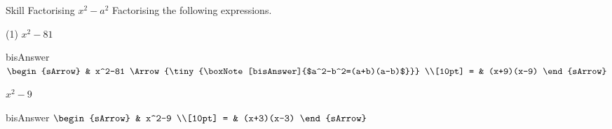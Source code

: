 \begin{boxSkill}{Skill   \thenskill \quad Factorising $x^2-a^2$}
  Factorising the following expressions.
  \begin{mtask}(1)
    \task[] $x^2-81$
              \begin{envOut}[equal height group=hRevF1]{bisAnswer}
			     $\begin{sArrow}
 			          & x^2-81         \Arrow{\tiny{\boxNote[bisAnswer]{$a^2-b^2=(a+b)(a-b)$}}} \\[10pt] 
                    = & (x+9)(x-9)
				  \end{sArrow}$	
              \end{envOut}%
    \task[] $x^2-9$
              \begin{envOut}[equal height group=hRevF1]{bisAnswer}
			     $\begin{sArrow}
 			          & x^2-9           \\[10pt] 
                    = & (x+3)(x-3)
				  \end{sArrow}$	
              \end{envOut}%
   \end{mtask}		  
\end{boxSkill}~%
